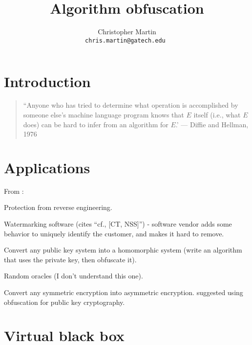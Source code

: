 \documentclass[10pt,twocolumn]{article}
\title{Algorithm obfuscation}
\date{}
\author{
  \begin{tabular}{c c c}
    Christopher Martin \\
    \small \tt{chris.martin@gatech.edu}
  \end{tabular}
}
\begin{document}
\thispagestyle{empty}


\section{Introduction}

\begin{quote}
``Anyone who has tried to determine what operation is accomplished by someone else's machine language
program knows that $E$ itself (i.e., what $E$ does) can be hard to infer from an algorithm for $E$.'
 --- Diffie and Hellman, 1976 \cite{newDirections}
\end{quote}


\section{Applications}

From \cite{onThe(Im)possibility}:

Protection from reverse engineering.

Watermarking software (cites ``cf., [CT, NSS]'') -
software vendor adds some behavior to uniquely identify the
customer, and makes it hard to remove.

Convert any public key system into a homomorphic system
(write an algorithm that uses the private key, then obfuscate it).

Random oracles (I don't understand this one).

Convert any symmetric encryption into asymmetric encryption.
\cite{newDirections} suggested using obfuscation for public key cryptography.

\section{Virtual black box}
\end{document}
